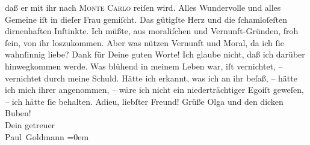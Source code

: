 \begin{ledgroupsized}[t]{13cm}
               daß er mit ihr nach \textsc{Monte Carlo} reiſen wird. Alles Wundervolle und alles Gemeine iſt in dieſer Frau gemiſcht. Das gütigſte
               Herz und die ſchamloſeſten dirnenhaften Inſtinkte. Ich müßte, aus moraliſchen und
               Vernunft-Gründen, froh ſein, von ihr loszukommen. Aber was nützen Vernunft und Moral,
               da ich ſie wahnſinnig liebe?\pend
           \pstart
           Dank für Deine guten Worte! {\pb}Ich glaube nicht, daß
               ich darüber hinwegkommen werde.  Was blühend in meinem Leben war, iſt vernichtet, –
               vernichtet durch meine Schuld. Hätte ich erkannt, was ich an ihr beſaß, – hätte ich
               mich ihrer angenommen, – wäre ich nicht ein niederträchtiger Egoiſt geweſen, – ich
               hätte ſie behalten.\pend
           \pstart
           Adieu, liebſter Freund! Grüße Olga und den
               dicken Buben! {\\[\baselineskip]}Dein
               getreuer {\\[\baselineskip]}\spacefill\mbox{Paul Goldmann}\pend
           \leftskip=0em{}
         
         \endnumbering{}\end{ledgroupsized}  \newcommand{\dateiname}{L03360}\newcommand{\titel}{Paul Goldmann an Arthur Schnitzler, 3. 1. [1903]}\newcommand{\editorInnen}{Martin Anton Müller und Laura Untner}
      